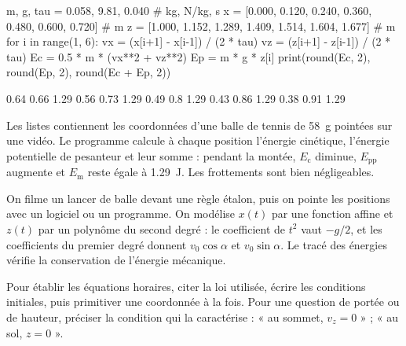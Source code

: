 \begin{python}
m, g, tau = 0.058, 9.81, 0.040                         # kg, N/kg, s
x = [0.000, 0.120, 0.240, 0.360, 0.480, 0.600, 0.720]  # m
z = [1.000, 1.152, 1.289, 1.409, 1.514, 1.604, 1.677]  # m
for i in range(1, 6):
    vx = (x[i+1] - x[i-1]) / (2 * tau)
    vz = (z[i+1] - z[i-1]) / (2 * tau)
    Ec = 0.5 * m * (vx**2 + vz**2)
    Ep = m * g * z[i]
    print(round(Ec, 2), round(Ep, 2), round(Ec + Ep, 2))
\end{python}
\begin{console}
0.64 0.66 1.29
0.56 0.73 1.29
0.49 0.8 1.29
0.43 0.86 1.29
0.38 0.91 1.29
\end{console}
\noindent{}Les listes contiennent les coordonnées d'une balle de tennis de 58~g pointées
sur une vidéo. Le programme calcule à chaque position l'énergie cinétique, l'énergie potentielle de pesanteur et leur
somme : pendant la montée, $E_\mathrm{c}$ diminue, $E_\mathrm{pp}$ augmente et $E_\mathrm{m}$ reste égale à
\qty{1,29}{J}. Les frottements sont bien négligeables.
\begin{experience}
On filme un lancer de balle devant une règle étalon, puis on pointe les positions avec un logiciel ou un programme. On
modélise $x(t)$ par une fonction affine et $z(t)$ par un polynôme du second degré : le coefficient de $t^2$ vaut
$-g/2$, et les coefficients du premier degré donnent $v_0\cos\alpha$ et $v_0\sin\alpha$. Le tracé des énergies vérifie la
conservation de l'énergie mécanique.
\end{experience}
\begin{rediger}
Pour établir les équations horaires, citer la loi utilisée, écrire les conditions initiales, puis primitiver une
coordonnée à la fois. Pour une question de portée ou de hauteur, préciser la condition qui la caractérise : « au sommet,
$v_z=0$ » ; « au sol, $z=0$ ».
\end{rediger}
\exercices

